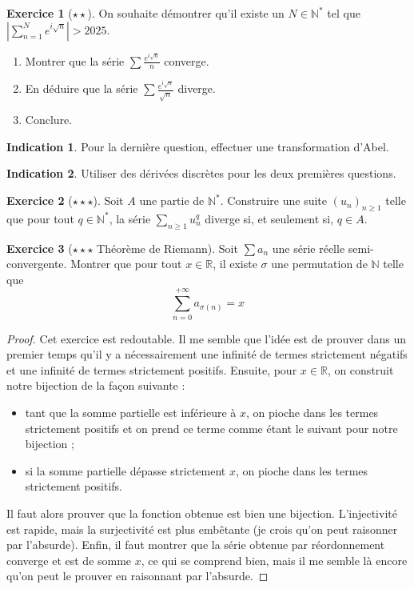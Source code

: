 \documentclass[french]{book}
\newcommand{\N}{\mathbb{N}}
\newcommand{\R}{\mathbb{R}}
\newcommand{\st}{^*}
\theoremstyle{definition}
\newtheorem{ex}{Exercice}[chapter]
\theoremstyle{theorem}
\newtheorem*{ind}{Indication}
\theoremstyle{remark}
\begin{document}
\begin{ex}[$\star\star$]
	On souhaite démontrer qu'il existe un $N\in\N\st$ tel que $\displaystyle\left\lvert\sum_{n=1}^{N}e^{i\sqrt{n}}\right\rvert>2025$.
	\begin{enumerate}
		\item Montrer que la série $\displaystyle\sum\frac{e^{i\sqrt{n}}}{n}$ converge.
		\item En déduire que la série $\displaystyle\sum\frac{e^{i\sqrt{n}}}{\sqrt{n}}$ diverge.
		\item Conclure.
	\end{enumerate}
\end{ex}

\begin{ind}
	Pour la dernière question, effectuer une transformation d'Abel.
\end{ind}

\begin{ind}
	Utiliser des dérivées discrètes pour les deux premières questions.
\end{ind}

\begin{ex}[$\star\star\star$]
	Soit $A$ une partie de $\N\st$. Construire une suite $(u_n)_{n\geqslant 1}$ telle que pour tout $q\in\N\st$, la série $\displaystyle\sum_{n\geqslant 1}u_n^q$ diverge si, et seulement si, $q\in A$.
\end{ex}

\begin{ex}[$\star\star\star$ Théorème de Riemann]
	Soit $\sum a_n$ une série réelle semi-convergente. Montrer que pour tout $x \in \R$, il existe $\sigma$ une permutation de $\N$ telle que $$\sum_{n=0}^{+\infty} a_{\sigma(n)}=x $$
\end{ex}

\begin{proof}
	Cet exercice est redoutable. Il me semble que l'idée est de prouver dans un premier temps qu'il y a nécessairement une infinité de termes strictement négatifs et une infinité de termes strictement positifs. Ensuite, pour $x\in\R$, on construit notre bijection de la façon suivante :
	\begin{itemize}
		\item tant que la somme partielle est inférieure à $x$, on pioche dans les termes strictement positifs et on prend ce terme comme étant le suivant pour notre bijection ;
		\item si la somme partielle dépasse strictement $x$, on pioche dans les termes strictement positifs.
	\end{itemize}
	Il faut alors prouver que la fonction obtenue est bien une bijection. L'injectivité est rapide, mais la surjectivité est plus embêtante (je crois qu'on peut raisonner par l'absurde). Enfin, il faut montrer que la série obtenue par réordonnement converge et est de somme $x$, ce qui se comprend bien, mais il me semble là encore qu'on peut le prouver en raisonnant par l'absurde.
\end{proof}
\end{document}
